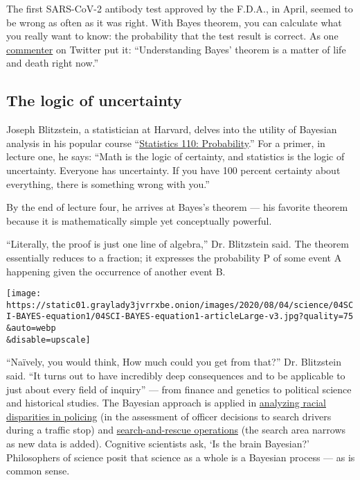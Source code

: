The first SARS-CoV-2 antibody test approved by the F.D.A., in April,
seemed to be wrong as often as it was right. With Bayes theorem, you can
calculate what you really want to know: the probability that the test
result is correct. As one
\href{https://twitter.com/Riderius/status/1246172832071135236}{commenter}
on Twitter put it: ``Understanding Bayes' theorem is a matter of life
and death right now.''

\hypertarget{the-logic-of-uncertainty}{%
\subsection{The logic of uncertainty}\label{the-logic-of-uncertainty}}

Joseph Blitzstein, a statistician at Harvard, delves into the utility of
Bayesian analysis in his popular course
``\href{https://www.youtube.com/playlist?list=PL2SOU6wwxB0uwwH80KTQ6ht66KWxbzTIo}{Statistics
110: Probability}.'' For a primer, in lecture one, he says: ``Math is
the logic of certainty, and statistics is the logic of uncertainty.
Everyone has uncertainty. If you have 100 percent certainty about
everything, there is something wrong with you.''

By the end of lecture four, he arrives at Bayes's theorem --- his
favorite theorem because it is mathematically simple yet conceptually
powerful.

``Literally, the proof is just one line of algebra,'' Dr. Blitzstein
said. The theorem essentially reduces to a fraction; it expresses the
probability P of some event A happening given the occurrence of another
event B.

\texttt{[image: https://static01.graylady3jvrrxbe.onion/images/2020/08/04/science/04SCI-BAYES-equation1/04SCI-BAYES-equation1-articleLarge-v3.jpg?quality=75\\\&auto=webp\\\&disable=upscale]}

``Naïvely, you would think, How much could you get from that?'' Dr.
Blitzstein said. ``It turns out to have incredibly deep consequences and
to be applicable to just about every field of inquiry'' --- from finance
and genetics to political science and historical studies. The Bayesian
approach is applied in
\href{https://www.nature.com/articles/s41562-020-0858-1}{analyzing
racial disparities in policing} (in the assessment of officer decisions
to search drivers during a traffic stop) and
\href{https://www.nytimes3xbfgragh.onion/2014/09/30/science/the-odds-continually-updated.html}{search-and-rescue
operations} (the search area narrows as new data is added). Cognitive
scientists ask, `Is the brain Bayesian?' Philosophers of science posit
that science as a whole is a Bayesian process --- as is common sense.


